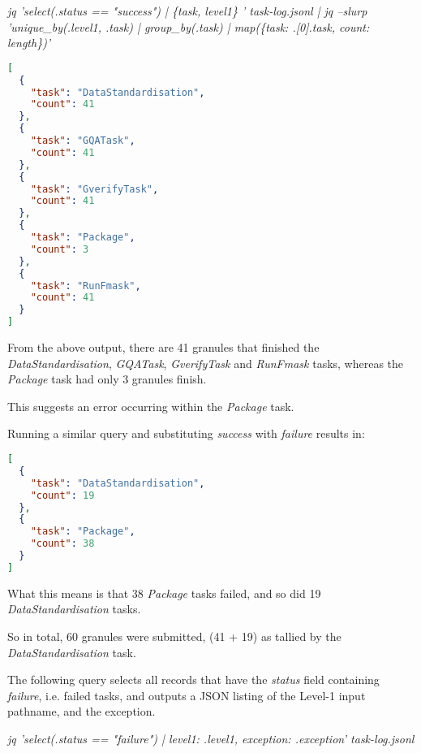 \documentclass[a4paper,oneside,titlepage]{article}
\begin{document}
    \begin{flushleft}
      \textit{{\tiny jq 'select(.status == "success") |
      \{task, level1\} ' task-log.jsonl |
      jq --slurp 'unique\_by(.level1, .task) |
      group\_by(.task) |
      map(\{task: .[0].task, count: length\})'}}
    \end{flushleft}

    \begin{lstlisting}[basicstyle=\tiny, language=json]
[
  {
    "task": "DataStandardisation",
    "count": 41
  },
  {
    "task": "GQATask",
    "count": 41
  },
  {
    "task": "GverifyTask",
    "count": 41
  },
  {
    "task": "Package",
    "count": 3
  },
  {
    "task": "RunFmask",
    "count": 41
  }
]
    \end{lstlisting}

    \begin{flushleft}
      From the above output, there are 41 granules that finished the \textit{DataStandardisation}, \textit{GQATask}, \textit{GverifyTask} and \textit{RunFmask} tasks, whereas the \textit{Package} task had only 3 granules finish. \par
      This suggests an error occurring within the \textit{Package} task. \par
      Running a similar query and substituting \textit{success} with \textit{failure} results in:
    \end{flushleft}

    \begin{lstlisting}[basicstyle=\tiny, language=json]
[
  {
    "task": "DataStandardisation",
    "count": 19
  },
  {
    "task": "Package",
    "count": 38
  }
]
    \end{lstlisting}

    \begin{flushleft}
      What this means is that 38 \textit{Package} tasks failed, and so did 19 \textit{DataStandardisation} tasks. \par
      So in total, 60 granules were submitted, (41 + 19) as tallied by the \textit{DataStandardisation} task.
    \end{flushleft}

    \begin{flushleft}
      The following query selects all records that have the \textit{status} field containing \textit{failure}, i.e. failed tasks, and outputs a JSON listing of the Level-1 input pathname, and the exception. \par
      \textit{{\tiny jq 'select(.status == "failure") | {level1: .level1, exception: .exception}' task-log.jsonl}}
    \end{flushleft}
\end{document}
